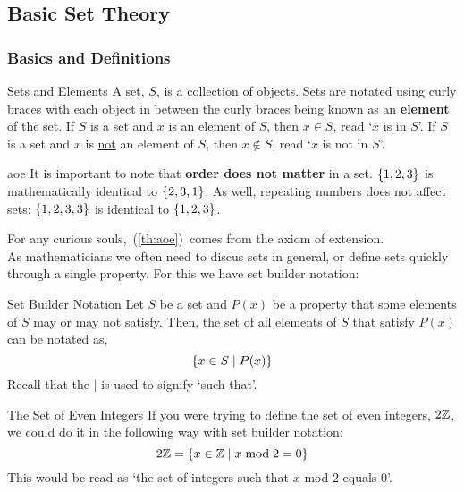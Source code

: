 \subsection{Basic Set Theory}
\subsubsection{Basics and Definitions}

\begin{definition}{Sets and Elements}{}
    A set, $S$, is a collection of objects. Sets are notated using curly braces with each object in between the curly braces being known as an \textbf{element} of the set. If $S$ is a set and $x$ is an element of $S$, then $x \in S$, read `$x$ is in $S$'. If $S$ is a set and $x$ is \underline{not} an element of $S$, then $x \not\in S$, read `$x$ is not in $S$'. 
\end{definition}

\begin{note}{}{aoe}
    It is important to note that \textbf{order does not matter} in a set. $\{1, 2, 3\}$ is mathematically identical to $\{2, 3, 1\}$. As well, repeating numbers does not affect sets: $\{1, 2, 3, 3\}$ is identical to $\{1, 2, 3\}$.
\end{note}

For any curious souls,~(\ref{th:aoe})~comes from the axiom of extension. \\ 
As mathematicians we often need to discus sets in general, or define sets quickly through a single property. For this we have set builder notation:

\begin{definition}{Set Builder Notation}{}
    Let $S$ be a set and $P(x)$ be a property that some elements of $S$ may or may not satisfy. Then, the set of all elements of $S$ that satisfy $P(x)$ can be notated as, 
    \begin{equation*}
        \{x \in S \mid P(x)\}
    \end{equation*}
    Recall that the $\mid$ is used to signify `such that'.
\end{definition}

\begin{example}{The Set of Even Integers}{}
    If you were trying to define the set of even integers, $2\mathbb Z$, we could do it in the following way with set builder notation: 
    \begin{equation*}
        2\mathbb Z = \{x \in \mathbb Z \mid x \bmod 2 = 0\}
    \end{equation*}
    This would be read as `the set of integers such that $x$ mod $2$ equals $0$'.
\end{example}

